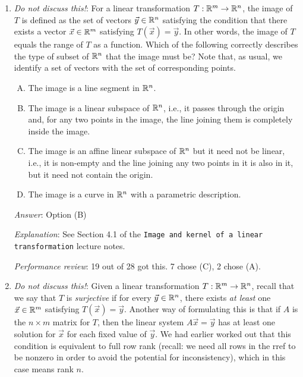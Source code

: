 \documentclass[10pt]{amsart}
\begin{document}
\begin{enumerate}
  {\em Answer}: Option (C)

  {\em Explanation}: See Sections 5 and 6 of the lecture notes titled
  {\tt Image and kernel of a linear transformation}.

  {\em Performance review}: 17 out of 28 got this. 8 chose (D), 3
  chose (E).

\item {\em Do not discuss this!}: For a linear transformation $T: \mathbb{R}^m
  \to \mathbb{R}^n$, the image of $T$ is defined as the set of vectors
  $\vec{y} \in \mathbb{R}^n$ satisfying the condition that there exists a
  vector $\vec{x} \in \mathbb{R}^m$ satisfying $T(\vec{x}) = \vec{y}$. In
  other words, the image of $T$ equals the range of $T$ as a
  function. Which of the following correctly describes the type of
  subset of $\mathbb{R}^n$ that the image must be? Note that, as usual, we
  identify a set of vectors with the set of corresponding points.
 
  \begin{enumerate}[(A)]
  \item The image is a line segment in $\mathbb{R}^n$.
  \item The image is a linear subspace of $\mathbb{R}^n$, i.e., it passes
    through the origin and, for any two points in the image, the line
    joining them is completely inside the image.
  \item The image is an affine linear subspace of $\mathbb{R}^n$ but it need
    not be linear, i.e., it is non-empty and the line joining any two
    points in it is also in it, but it need not contain the origin.
  \item The image is a curve in $\mathbb{R}^n$ with a parametric description.
  \end{enumerate}

  {\em Answer}: Option (B)

  {\em Explanation}: See Section 4.1 of the {\tt Image and kernel of a
    linear transformation} lecture notes.

  {\em Performance review}: 19 out of 28 got this. 7 chose (C), 2
  chose (A).

\item {\em Do not discuss this!}: Given a linear transformation
  $T:\mathbb{R}^m \to \mathbb{R}^n$, recall that we say that $T$ is {\em surjective} if
  for every $\vec{y} \in \mathbb{R}^n$, there exists {\em at least} one
  $\vec{x} \in \mathbb{R}^m$ satisfying $T(\vec{x}) = \vec{y}$. Another way of
  formulating this is that if $A$ is the $n \times m$ matrix for $T$,
  then the linear system $A\vec{x} = \vec{y}$ has at least one solution
  for $\vec{x}$ for each fixed value of $\vec{y}$. We had earlier
  worked out that this condition is equivalent to full row rank
  (recall: we need all rows in the rref to be nonzero in order to
  avoid the potential for inconsistency), which in this case means
  rank $n$.


\end{enumerate}
\end{document}
